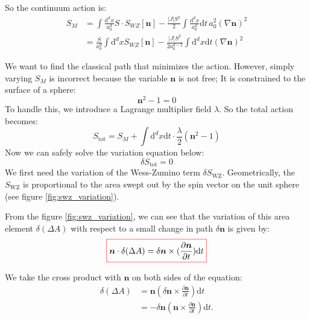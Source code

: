 So the continuum action is:
\begin{equation}
\begin{aligned}
S_M &= \int \frac{\mathrm{d}^d x}{a_0^d} S \cdot S_{WZ} [\bm{n}] - \frac{|J|S^2}{2} \int \frac{\mathrm{d}^d x}{a_0^d} \mathrm{d}t \, a_0^2 (\nabla \bm{n})^2 \\
&= \frac{S}{a_0^d} \int \mathrm{d}^d x S_{WZ}[\bm{n}] - \frac{|J|S^2}{2a_0^{d-2}} \int \mathrm{d}^d x \mathrm{d}t (\nabla \bm{n})^2
\end{aligned}
\end{equation}

We want to find the classical path that minimizes the action. 
However, simply varying $S_M$ is incorrect because the variable $\bm{n}$ is not free; 
It is constrained to the surface of a sphere:
\begin{equation}
\bm{n}^2 - 1 = 0
\end{equation}
To handle this, we introduce a Lagrange multiplier field $\lambda$. So the total action becomes:
\begin{equation}
S_{\mathrm{tot}} = S_M + \int \mathrm{d}^d x \mathrm{d}t \cdot \frac{\lambda}{2}(\bm{n}^2 - 1)
\end{equation}
Now we can safely solve the variation equation below:
\begin{equation}
\delta S_{\mathrm{tot}} = 0
\end{equation}
We first need the variation of the Wess-Zumino term $\delta S_{\mathrm{WZ}}$. 
Geometrically, 
the $S_{\mathrm{WZ}}$ is proportional to the area swept out by the spin vector on the unit sphere
(see figure \ref{fig:swz_variation}).

From the figure \ref{fig:swz_variation}, 
we can see that the variation of this area element $\delta(\Delta A)$ 
with respect to a small change in path $\delta \bm{n}$ is given by:
\begin{equation}
    \colorboxed{
    \bm{n} \cdot \delta(\Delta A) = \delta \bm{n} \times (\frac{\partial \bm{n}}{\partial t}) \mathrm{d}t
    }
\end{equation}



We take the cross product with $\bm{n}$ on both sides of the equation:
\begin{equation}
\begin{aligned}
\delta(\Delta A) &= \bm{n} (\delta \bm{n} \times \frac{\partial \bm{n}}{\partial t}) \mathrm{d}t \\
&= - \delta \bm{n} (\bm{n} \times \frac{\partial \bm{n}}{\partial t}) \mathrm{d}t.
\end{aligned}
\end{equation}

